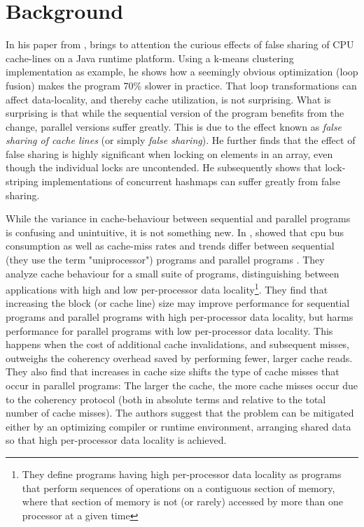 \chapter{Background}
In his paper \cite{mystery} from \citeyear{mystery}, \citeauthor{mystery} brings to attention the curious effects of
false sharing of CPU cache-lines on a Java runtime platform. Using a k-means
clustering implementation as example, he shows how a seemingly obvious
optimization (loop fusion) makes the program 70\% slower in practice. That loop
transformations can affect data-locality,
and thereby cache utilization, is not surprising. What is surprising is that
while the sequential version of the program benefits from the change, parallel
versions suffer greatly. This is due to the effect known as \textit{false
sharing of cache lines} (or simply \textit{false sharing}). He further finds that
the effect of false sharing is highly significant when locking on elements in an
array, even though the individual locks are uncontended. He subsequently shows that
lock-striping implementations of concurrent hashmaps can suffer greatly from
false sharing.

While the variance in cache-behaviour between sequential and parallel programs
is confusing and unintuitive, it is not something new. In \citeyear{Eggersbus},
\citeauthor{Eggersbus} showed that cpu bus consumption as well as cache-miss
rates and trends differ between sequential (they use the term "uniprocessor")
programs and parallel programs \cite{Eggersbus}.
They analyze cache behaviour for a small suite of programs, distinguishing
between applications with high and low per-processor data locality\footnote{They
define programs having high per-processor data locality as programs that perform
sequences of operations on a contiguous section of memory, where that section of
memory is not (or rarely) accessed by more than one processor at a given time}.
They find that increasing the block (or cache line) size may improve
performance for sequential programs and parallel programs with high
per-processor data locality, but harms performance for parallel programs with
low per-processor data locality. This happens when the cost of additional cache
invalidations, and subsequent misses, outweighs the coherency overhead saved by
performing fewer, larger cache reads. They also find that increases in cache
size shifts the type of cache misses that occur in parallel programs: The larger
the cache, the more cache misses occur due to the coherency protocol (both in
absolute terms and relative to the total number of cache misses). The authors
suggest that the problem can be mitigated either by an optimizing compiler or
runtime environment, arranging shared data so that high per-processor data
locality is achieved.

